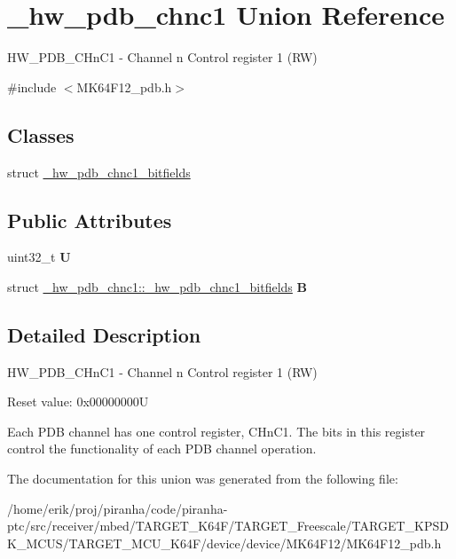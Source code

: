 \hypertarget{union__hw__pdb__chnc1}{}\section{\+\_\+hw\+\_\+pdb\+\_\+chnc1 Union Reference}
\label{union__hw__pdb__chnc1}


H\+W\+\_\+\+P\+D\+B\+\_\+\+C\+Hn\+C1 -\/ Channel n Control register 1 (RW)  




{\ttfamily \#include $<$M\+K64\+F12\+\_\+pdb.\+h$>$}

\subsection*{Classes}
\begin{DoxyCompactItemize}
\item 
struct \hyperlink{struct__hw__pdb__chnc1_1_1__hw__pdb__chnc1__bitfields}{\+\_\+hw\+\_\+pdb\+\_\+chnc1\+\_\+bitfields}
\end{DoxyCompactItemize}
\subsection*{Public Attributes}
\begin{DoxyCompactItemize}
\item 
uint32\+\_\+t {\bfseries U}\hypertarget{union__hw__pdb__chnc1_aafc995035c585760d1a3f2941999fb9e}{}\label{union__hw__pdb__chnc1_aafc995035c585760d1a3f2941999fb9e}

\item 
struct \hyperlink{struct__hw__pdb__chnc1_1_1__hw__pdb__chnc1__bitfields}{\+\_\+hw\+\_\+pdb\+\_\+chnc1\+::\+\_\+hw\+\_\+pdb\+\_\+chnc1\+\_\+bitfields} {\bfseries B}\hypertarget{union__hw__pdb__chnc1_ac4adb502fdfd5bacb9915ef934d8e34f}{}\label{union__hw__pdb__chnc1_ac4adb502fdfd5bacb9915ef934d8e34f}

\end{DoxyCompactItemize}


\subsection{Detailed Description}
H\+W\+\_\+\+P\+D\+B\+\_\+\+C\+Hn\+C1 -\/ Channel n Control register 1 (RW) 

Reset value\+: 0x00000000U

Each P\+DB channel has one control register, C\+Hn\+C1. The bits in this register control the functionality of each P\+DB channel operation. 

The documentation for this union was generated from the following file\+:\begin{DoxyCompactItemize}
\item 
/home/erik/proj/piranha/code/piranha-\/ptc/src/receiver/mbed/\+T\+A\+R\+G\+E\+T\+\_\+\+K64\+F/\+T\+A\+R\+G\+E\+T\+\_\+\+Freescale/\+T\+A\+R\+G\+E\+T\+\_\+\+K\+P\+S\+D\+K\+\_\+\+M\+C\+U\+S/\+T\+A\+R\+G\+E\+T\+\_\+\+M\+C\+U\+\_\+\+K64\+F/device/device/\+M\+K64\+F12/M\+K64\+F12\+\_\+pdb.\+h\end{DoxyCompactItemize}

